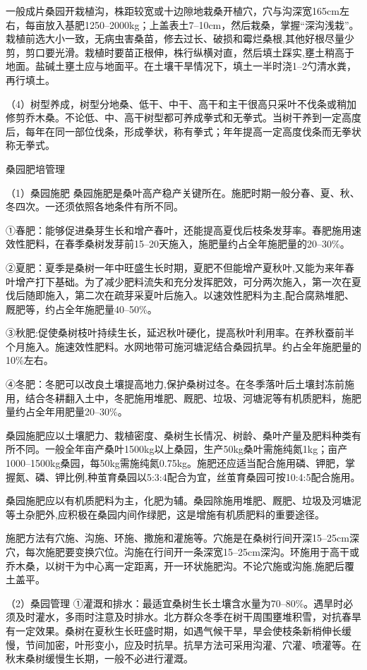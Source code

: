 \documentclass{ctexbook}
\begin{document}
一般成片桑园开栽植沟，株距较宽或十边隙地栽桑开植穴，穴与沟深宽165cm左右，每亩放入基肥1250--2000kg；上盖表土7--10cm，然后栽桑，掌握“深沟浅栽”。
栽植前选大小一致，无病虫害桑苗，修去过长、破损和霉烂桑根,其他好根尽量少剪，剪口要光滑。栽植时要苗正根伸，株行纵横对直，然后填土踩实,壅土稍高于地面。盐碱土壅土应与地面平。在土壤干旱情况下，填土一半时浇1--2勺清水粪，再行填土。

（4）树型养成，树型分地桑、低干、中干、高干和主干很高只采叶不伐条或稍加修剪乔木桑。不论低、中、高干树型都可养成拳式和无拳式。当树干养到一定高度后，每年在同一部位伐条，形成拳状，称有拳式；年年提高一定高度伐条而无拳状称无拳式。

桑园肥培管理

（1）桑园施肥 桑园施肥是桑叶高产稳产关键所在。施肥时期一般分春、夏、秋、冬四次。一还须依照各地条件有所不同。

①春肥：能够促进桑芽生长和增产春叶，还能提高夏伐后枝条发芽率。春肥施用速效性肥料，在春季桑树发芽前15--20天施入，施肥量约占全年施肥量的20--30\%。

②夏肥：夏季是桑树一年中旺盛生长时期，夏肥不但能增产夏秋叶,又能为来年春叶增产打下基础。为了减少肥料流失和充分发挥肥效，可分两次施入，第一次在夏伐后随即施入，第二次在疏芽采夏叶后施入。以速效性肥料为主,配合腐熟堆肥、厩肥等，约占全年施肥量40--50\%。

③秋肥:促使桑树枝叶持续生长，延迟秋叶硬化，提高秋叶利用率。在养秋蚕前半个月施入。施速效性肥料。水网地带可施河塘泥结合桑园抗旱。约占全年施肥量的10\%左右。

④冬肥：冬肥可以改良土壤提高地力,保护桑树过冬。在冬季落叶后土壤封冻前施用，结合冬耕翻入土中，冬肥施用堆肥、厩肥、垃圾、河塘泥等有机质肥料，施肥量约占全年用肥量20--30\%。

桑园施肥应以土壤肥力、栽植密度、桑树生长情况、树龄、桑叶产量及肥料种类有所不同。一般全年亩产桑叶1500kg以上桑园，生产50kg桑叶需施纯氮1kg；亩产1000--1500kg桑园，每50kg需施纯氮0.75kg。施肥还应适当配合施用磷、钾肥，掌握氮、磷、钾比例,种茧育桑园以5:3:4配合为宜，丝茧育桑园可按10:4:5配合施用。

桑园施肥应以有机质肥料为主，化肥为辅。桑园除施用堆肥、厩肥、垃圾及河塘泥等土杂肥外,应积极在桑园内间作绿肥，这是增施有机质肥料的重要途径。

施肥方法有穴施、沟施、环施、撒施和灌施等。穴施是在桑树行间开深15--25cm深穴，每次施肥要变换穴位。沟施在行间开一条深宽15--25cm深沟。环施用于高干或乔木桑，以树干为中心离一定距离，开一环状施肥沟。不论穴施或沟施,施肥后覆土盖平。

（2）桑园管理
①灌溉和排水：最适宜桑树生长土壤含水量为70--80\%。遇旱时必须及时灌水，多雨时注意及时排水。北方群众冬季在树干周围壅堆积雪，对抗春旱有一定效果。桑树在夏秋生长旺盛时期，如遇气候干旱，旱会使枝条新梢伸长缓慢，节间加密，叶形变小，应及时抗旱。抗旱方法可采用沟灌、穴灌、喷灌等。在秋末桑树缓慢生长期，一般不必进行灌溉。
\end{document}
